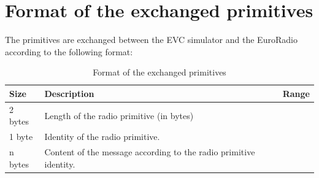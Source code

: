 \documentclass[nocc]{template/openetcs_report}
\begin{document}
\section{Format of the exchanged primitives}
The primitives are exchanged between the EVC simulator and the EuroRadio according to the following format:
			\begin{longtable}{|l|l|l|}
				\caption{Format of the exchanged primitives}\\ 
				\hline
				
					\begin{minipage}[t]{0.2\linewidth} \textbf{Size}	\end{minipage}
				&	\begin{minipage}[t]{0.6\linewidth} \textbf{Description}	\end{minipage}
				&	\begin{minipage}[t]{0.2\linewidth} \textbf{Range} \end{minipage} \\
				
				\hline
				
					\begin{minipage}[t]{0.2\linewidth}2 bytes \end{minipage}
					&\begin{minipage}[t]{0.6\linewidth} Length of the radio primitive (in bytes)	\end{minipage}
					&\begin{minipage}[t]{0.2\linewidth} \end{minipage} \\
				
				\hline
								
					\begin{minipage}[t]{0.2\linewidth}1 byte \end{minipage}
					&\begin{minipage}[t]{0.6\linewidth} Identity of the radio primitive.	\end{minipage}
					&\begin{minipage}[t]{0.2\linewidth} \end{minipage} \\
				
				\hline

					\begin{minipage}[t]{0.2\linewidth}n bytes \end{minipage}
					&\begin{minipage}[t]{0.6\linewidth} Content of the message according to the radio primitive identity.	\end{minipage}
					&\begin{minipage}[t]{0.2\linewidth} \end{minipage} \\
				
				\hline														
			\end{longtable}
\end{document}
